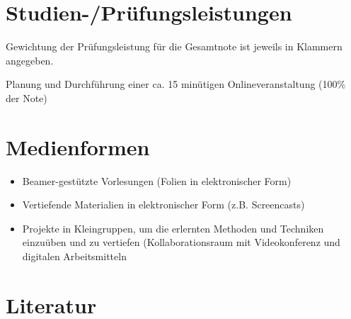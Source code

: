 \section*{Studien-/Prüfungsleistungen\label{/mi-2017/modulbeschreibungen-master/MA_SC_WPF_CSCL}}\label{studien-pruxfcfungsleistungenpathlabelmi-2017modulbeschreibungen-mastermaux5fscux5fwpfux5fcscl}

Gewichtung der Prüfungsleistung für die Gesamtnote ist jeweils in
Klammern angegeben.

Planung und Durchführung einer ca. 15 minütigen Onlineveranstaltung
(100\% der Note)

\section*{Medienformen\label{/mi-2017/modulbeschreibungen-master/MA_SC_WPF_CSCL}}\label{medienformenpathlabelmi-2017modulbeschreibungen-mastermaux5fscux5fwpfux5fcscl}

\begin{itemize}
\tightlist
\item
  Beamer-gestützte Vorlesungen (Folien in elektronischer Form)
\item
  Vertiefende Materialien in elektronischer Form (z.B. Screencasts)
\item
  Projekte in Kleingruppen, um die erlernten Methoden und Techniken
  einzuüben und zu vertiefen (Kollaborationsraum mit Videokonferenz und
  digitalen Arbeitsmitteln
\end{itemize}

\section*{Literatur\label{/mi-2017/modulbeschreibungen-master/MA_SC_WPF_CSCL}}\label{literaturpathlabelmi-2017modulbeschreibungen-mastermaux5fscux5fwpfux5fcscl}

